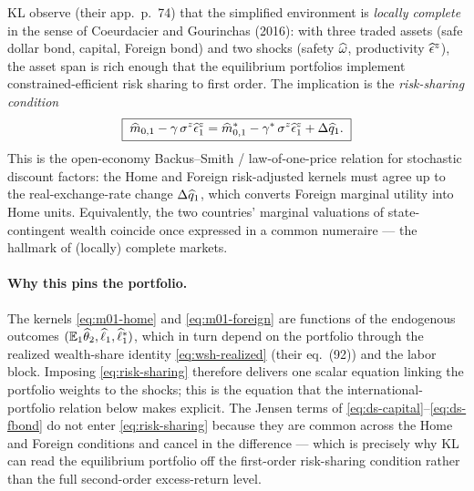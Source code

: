 KL observe (their app.~p.~74) that the simplified environment is \emph{locally
complete} in the sense of Coeurdacier and Gourinchas (2016): with three traded
assets (safe dollar bond, capital, Foreign bond) and two shocks (safety
$\widehat{\omega}$, productivity $\widehat{\epsilon}^z$), the asset span is rich enough that
the equilibrium portfolios implement constrained-efficient risk sharing to first
order. The implication is the \emph{risk-sharing condition}
\begin{equation}
\boxed{\;\widehat{m}_{0,1} - \gamma\,\sigma^z\widehat{\epsilon}^z_1
= \widehat{m}^{*}_{0,1} - \gamma^{*}\,\sigma^z\widehat{\epsilon}^z_1 + \Delta\widehat{q}_1.\;} \label{eq:risk-sharing}
\end{equation}
This is the open-economy Backus--Smith / law-of-one-price relation for stochastic
discount factors: the Home and Foreign risk-adjusted kernels must agree up to the
real-exchange-rate change $\Delta\widehat{q}_1$, which converts Foreign marginal
utility into Home units. Equivalently, the two countries' marginal valuations of
state-contingent wealth coincide once expressed in a common numeraire --- the
hallmark of (locally) complete markets.

\paragraph{Why this pins the portfolio.} The kernels \eqref{eq:m01-home} and
\eqref{eq:m01-foreign} are functions of the endogenous outcomes
$(\mathbb{E}_1\widehat{\theta}_2,\widehat{\ell}_1,\widehat{\ell}^{*}_1)$, which in turn depend on the
portfolio through the realized wealth-share identity \eqref{eq:wsh-realized}
(their eq.~(92)) and the labor block. Imposing \eqref{eq:risk-sharing} therefore
delivers one scalar equation linking the portfolio weights to the shocks; this is
the equation that the international-portfolio relation below makes explicit. The
Jensen terms of \eqref{eq:ds-capital}--\eqref{eq:ds-fbond} do not enter
\eqref{eq:risk-sharing} because they are common across the Home and Foreign
conditions and cancel in the difference --- which is precisely why KL can read the
equilibrium portfolio off the first-order risk-sharing condition rather than the
full second-order excess-return level.

